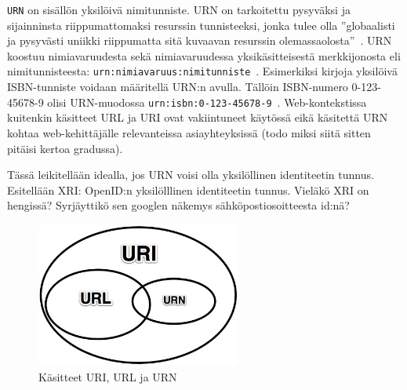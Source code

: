 \documentclass[finnish,gradu]{tktltiki}
\begin{document}
  \verb!URN! on sisällön yksilöivä nimitunniste. URN on tarkoitettu pysyväksi ja sijainninsta riippumattomaksi resurssin tunnisteeksi, jonka tulee olla ''globaalisti ja pysyvästi uniikki riippumatta sitä kuvaavan resurssin olemassaolosta''~\cite{ietf_rfc_uri_syntax}. URN koostuu nimiavaruudesta sekä nimiavaruudessa yksikäsitteisestä merkkijonosta eli nimitunnisteesta: \verb!urn:nimiavaruus:nimitunniste!~\cite{ietf_rfc_urn_syntax}. Esimerkiksi kirjoja yksilöivä ISBN-tunniste voidaan määritellä URN:n avulla. Tällöin ISBN-numero 0-123-45678-9 olisi URN-muodossa \verb!urn:isbn:0-123-45678-9!~\cite{w3c_uri_clarifications}. Web-kontekstissa kuitenkin käsitteet URL ja URI ovat vakiintuneet käytössä eikä käsitettä URN kohtaa web-kehittäjälle relevanteissa asiayhteyksissä (todo miksi siitä sitten pitäisi kertoa gradussa).

  Tässä leikitellään idealla, jos URN voisi olla yksilöllinen identiteetin tunnus. Esitellään XRI: OpenID:n yksilölllinen identiteetin tunnus. Vieläkö XRI on hengissä? Syrjäyttikö sen googlen näkemys sähköpostiosoitteesta id:nä?

  \begin{figure}
    \centering
    \includegraphics[width=0.6\textwidth]{images/uri_url_urn.jpg}
    \caption{Käsitteet URI, URL ja URN}
    \label{fig:uri_url_urn}
  \end{figure}



\end{document}
